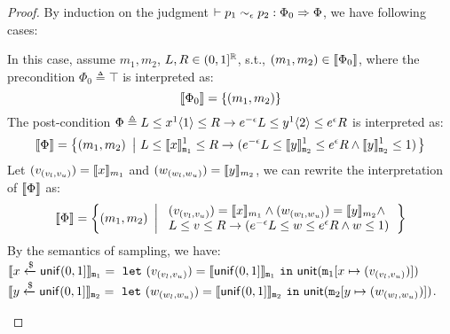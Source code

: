 \documentclass[a4paper,11pt]{article}
\begin{document}
\begin{proof}
By induction on the judgment $\vdash p_1	
\sim_{\epsilon}
p_2 :
\Phi_0 \Rightarrow \Phi $, we have following cases:
\begin{itemize}
\caseL{\[
\inferrule
{
	\forall \rvalL, \rvalR \in (0,1]^{\real}
}
{
	\vdash
	\varx \samplel \uniform(0, 1] 	
	\sim_{\epsilon} 
	\vary \samplel \uniform(0, 1]
	:
	\top
	\Rightarrow
	\rvalL \leq \varx^1 \langle 1 \rangle \leq \rvalR 
			\imply
	(e^{\epsilon} \rvalL \leq \vary^1 \langle 2 \rangle \leq e^{\epsilon} \rvalR
	\land \vary^1 \langle 2 \rangle \leq 1)	
}~\textbf{unif+}
\]}
	In this case, 
	assume $m_1, m_2$, $L, R \in (0,1]^{\mathbb{R}}$, s.t.,
	$(m_1, m_2) \in \llbracket \Phi_0 \rrbracket$, where the precondition
	$
	\Phi_0 \triangleq
	\top
	$
	is interpreted as:
	\[
	\llbracket \Phi_0 \rrbracket =
	\left \{
	(m_1, m_2)
	\right \}
	\]
	The post-condition $\Phi \triangleq 
		L \leq x^1 \langle 1 \rangle \leq R
		\rightarrow
	e^{-\epsilon} L \leq y^1 \langle 2 \rangle \leq e^{\epsilon}R
	$ is interpreted as:
	\[
	\llbracket \Phi \rrbracket =
	\left \{
	(m_1, m_2)
	~ \left \vert ~
	L \leq \llbracket x \rrbracket_{\mathtt{m}_1}^1 \leq R
	\rightarrow
	(e^{-\epsilon} L \leq \llbracket y \rrbracket_{\mathtt{m}_2}^1 \leq e^{\epsilon}R
		\land \llbracket y \rrbracket_{\mathtt{m}_2}^1 \leq 1)
	\right.
	\right \}
	\]
	Let $(v_{(v_{l}, v_{u})}) = \llbracket x \rrbracket_{m_1}$ and 
	$(w_{(w_{l}, w_{u})}) = \llbracket y \rrbracket_{m_2}$, we can rewrite the interpretation of $\llbracket \Phi \rrbracket$ as:
\[
	\llbracket \Phi \rrbracket =
	\left \{
	(m_1, m_2)
	~ \left \vert ~
	\begin{array}{l}
	(v_{(v_{l}, v_{u})}) = \llbracket x \rrbracket_{m_1}
	\land 
	(w_{(w_{l}, w_{u})}) = \llbracket y \rrbracket_{m_2}
	\land
	\\
	L \leq v \leq R
	\rightarrow
	(e^{-\epsilon} L \leq 
		w \leq e^{\epsilon}R
		\land w \leq 1)
	\end{array}
	\right.
	\right \}
\]
	By the semantics of sampling, we have:\\
	$\llbracket x \xleftarrow{\$} \mathsf{unif}(0, 1] \rrbracket_{\mathtt{m}_1} =
	~\mathtt{let}~ (v_{(v_{l}, v_{u})}) 
	= \llbracket \mathsf{unif}(0, 1] \rrbracket_{\mathtt{m}_1} 
	~\mathtt{in}~ 
	\mathsf{unit}(\mathtt{m}_1[x \mapsto (v_{(v_{l}, v_{u})})])
	$
	\\
	$\llbracket y \xleftarrow{\$} \mathsf{unif}(0, 1] \rrbracket_{\mathtt{m}_2} = 
	~\mathtt{let}~ (w_{(w_{l}, w_{u})})
	= \llbracket \mathsf{unif}(0, 1] \rrbracket_{\mathtt{m}_2} 
	~\mathtt{in}~ 
	\mathsf{unit}(\mathtt{m}_2[y \mapsto (w_{(w_{l}, w_{u})})])
	$. \\

\end{itemize}
\end{proof}
\end{document}
